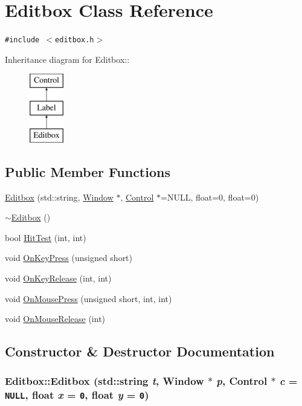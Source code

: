 \hypertarget{class_editbox}{
\section{Editbox Class Reference}
\label{class_editbox}
}
{\tt \#include $<$editbox.h$>$}

Inheritance diagram for Editbox::\begin{figure}[H]
\begin{center}
\leavevmode
\includegraphics[height=3cm]{class_editbox}
\end{center}
\end{figure}
\subsection*{Public Member Functions}
\begin{CompactItemize}
\item 
\hyperlink{class_editbox_923e9201e93b6d48edd9b82d0d96b33e}{Editbox} (std::string, \hyperlink{class_window}{Window} $\ast$, \hyperlink{class_control}{Control} $\ast$=NULL, float=0, float=0)
\item 
\hyperlink{class_editbox_e7644c25521d41d57a1d76f2c2e904dd}{$\sim$Editbox} ()
\item 
bool \hyperlink{class_editbox_2eacf0b4a9e2f2fd20125658156fb4e0}{HitTest} (int, int)
\item 
void \hyperlink{class_editbox_03de7605a4541011037378e745012f17}{OnKeyPress} (unsigned short)
\item 
void \hyperlink{class_editbox_47d72239d116c6574d2f14a84aa658cb}{OnKeyRelease} (int, int)
\item 
void \hyperlink{class_editbox_c116bf79fae6dee06d3f65109b8ccc1c}{OnMousePress} (unsigned short, int, int)
\item 
void \hyperlink{class_editbox_3426720f14c8827bc9838f76ff75ebc3}{OnMouseRelease} (int)
\end{CompactItemize}


\subsection{Constructor \& Destructor Documentation}
\hypertarget{class_editbox_923e9201e93b6d48edd9b82d0d96b33e}{
\subsubsection[{Editbox}]{\setlength{\rightskip}{0pt plus 5cm}Editbox::Editbox (std::string {\em t}, \/  {\bf Window} $\ast$ {\em p}, \/  {\bf Control} $\ast$ {\em c} = {\tt NULL}, \/  float {\em x} = {\tt 0}, \/  float {\em y} = {\tt 0})}}
\label{class_editbox_923e9201e93b6d48edd9b82d0d96b33e}


